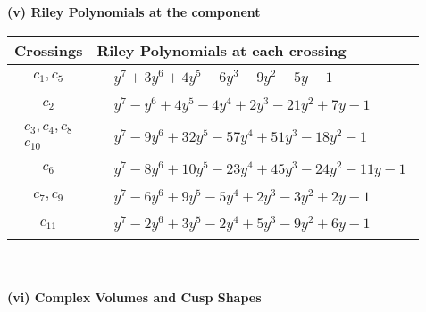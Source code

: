\documentclass[1p]{elsarticle_modified}
\theoremstyle{definition}
\begin{document}
\newpage\renewcommand{\arraystretch}{1}
\flushleft \textbf{(v) Riley Polynomials at the component}\newline \\
\begin{tabular}{m{50pt}|m{274pt}}
Crossings & \hspace{64pt}Riley Polynomials at each crossing \\
\hline $$\begin{aligned}c_{1},c_{5}\end{aligned}$$&$\begin{aligned}
&y^7+3 y^6+4 y^5-6 y^3-9 y^2-5 y-1
\end{aligned}$\\
\hline $$\begin{aligned}c_{2}\end{aligned}$$&$\begin{aligned}
&y^7- y^6+4 y^5-4 y^4+2 y^3-21 y^2+7 y-1
\end{aligned}$\\
\hline $$\begin{aligned}c_{3},c_{4},c_{8}\\c_{10}\end{aligned}$$&$\begin{aligned}
&y^7-9 y^6+32 y^5-57 y^4+51 y^3-18 y^2-1
\end{aligned}$\\
\hline $$\begin{aligned}c_{6}\end{aligned}$$&$\begin{aligned}
&y^7-8 y^6+10 y^5-23 y^4+45 y^3-24 y^2-11 y-1
\end{aligned}$\\
\hline $$\begin{aligned}c_{7},c_{9}\end{aligned}$$&$\begin{aligned}
&y^7-6 y^6+9 y^5-5 y^4+2 y^3-3 y^2+2 y-1
\end{aligned}$\\
\hline $$\begin{aligned}c_{11}\end{aligned}$$&$\begin{aligned}
&y^7-2 y^6+3 y^5-2 y^4+5 y^3-9 y^2+6 y-1
\end{aligned}$\\
\hline
\end{tabular}\\~\\
\newpage\flushleft \textbf{(vi) Complex Volumes and Cusp Shapes}
\end{document}
